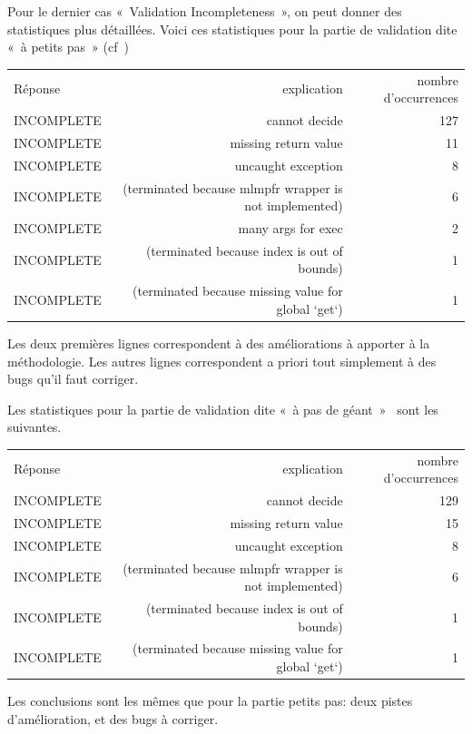 \documentclass[a4paper,11pt]{article}
\begin{document}
Pour le dernier cas «~Validation Incompleteness~», on peut donner des
statistiques plus détaillées. Voici ces statistiques pour la partie de
validation dite «~à petits pas~» (cf~\cite{becker21fide})
  \begin{center}
  \begin{tabular}{|l|r|r|}
    \hline
    \rowcolor{gray!50} Réponse
  & \multicolumn{1}{p{0.65\textwidth}|}{explication}
  & \multicolumn{1}{p{0.13\textwidth}|}{nombre d'occurrences}
    \\
INCOMPLETE & cannot decide	& 127 \\
INCOMPLETE & missing return value & 11 \\
INCOMPLETE & uncaught exception	& 8 \\
INCOMPLETE & (terminated because mlmpfr wrapper is not implemented) & 6 \\
INCOMPLETE & many args for exec	& 2 \\
INCOMPLETE & (terminated because index is out of bounds) & 1 \\
    INCOMPLETE & (terminated because missing value for global `get`) & 1 \\
    \hline
\end{tabular}
\end{center}
Les deux premières lignes correspondent à des améliorations à apporter
à la méthodologie. Les autres lignes correspondent a priori tout
simplement à des bugs qu'il faut corriger.

Les statistiques pour la
partie de validation dite «~à pas de géant~»~\cite{becker21rr} sont les suivantes.
\begin{center}
  \begin{tabular}{|l|r|r|}
    \hline
  \rowcolor{gray!50} Réponse
  & \multicolumn{1}{p{0.65\textwidth}|}{explication}
  & \multicolumn{1}{p{0.13\textwidth}|}{nombre d'occurrences}
    \\
INCOMPLETE & cannot decide	& 129 \\
INCOMPLETE & missing return value  &	15 \\
INCOMPLETE & uncaught exception	& 8 \\
INCOMPLETE &  (terminated because mlmpfr wrapper is not implemented) &	6 \\
INCOMPLETE & (terminated because index is out of bounds) &	1 \\
    INCOMPLETE & (terminated because missing value for global `get`) &	1 \\
    \hline
  \end{tabular}
\end{center}
Les conclusions sont les mêmes que pour la partie petits pas: deux
pistes d'amélioration, et des bugs à corriger.
\end{document}
